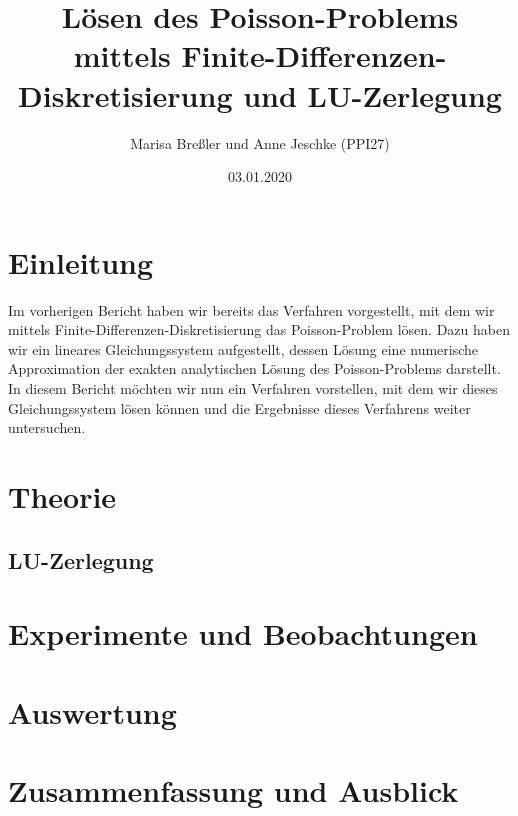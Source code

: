 \documentclass{scrartcl}
\begin{document}
\title{Lösen des Poisson-Problems mittels Finite-Differenzen-Diskretisierung und LU-Zerlegung}
\author{Marisa Breßler und Anne Jeschke (PPI27)}
\date{03.01.2020}
\maketitle

\tableofcontents

\pagebreak
\section{Einleitung}
Im vorherigen Bericht haben wir bereits das Verfahren vorgestellt, mit dem wir mittels Finite-Differenzen-Diskretisierung das Poisson-Problem lösen.
Dazu haben wir ein lineares Gleichungssystem aufgestellt, dessen Lösung eine numerische Approximation der exakten analytischen Lösung des Poisson-Problems darstellt.
In diesem Bericht möchten wir nun ein Verfahren vorstellen, mit dem wir dieses Gleichungssystem lösen können und die Ergebnisse dieses Verfahrens weiter untersuchen.

\pagebreak
\section{Theorie}

\subsection{LU-Zerlegung}


\pagebreak
\section{Experimente und Beobachtungen}

\pagebreak
\section{Auswertung}

\pagebreak
\section{Zusammenfassung und Ausblick}


\pagebreak



\end{document}
